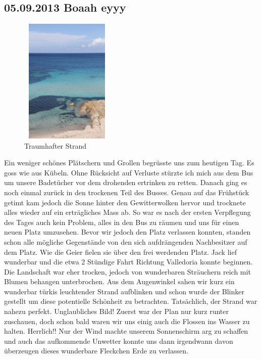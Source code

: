 \subsection{05.09.2013 Boaah eyyy} 

\begin{figure} 
  \begin{centering}
    \includegraphics[width=0.4\textwidth, height=6cm, keepaspectratio]{../Bilder/Sardinien/27.jpg}
    \caption{Traumhafter Strand}
  \end{centering}
\end{figure} 

Ein weniger schönes Plätschern und Grollen begrüsste uns zum heutigen Tag.
Es goss wie aus Kübeln.
Ohne Rücksicht auf Verluste stürzte ich mich aus dem Bus um unsere Badetücher vor dem drohenden ertrinken zu retten.
Danach ging es noch einmal zurück in den trockenen Teil des Busses.
Genau auf das Frühstück getimt kam jedoch die Sonne hinter den Gewitterwolken hervor und trocknete alles wieder auf ein erträgliches Mass ab.
So war es nach der ersten Verpflegung des Tages auch kein Problem, alles in den Bus zu räumen und uns für einen neuen Platz umzusehen.
Bevor wir jedoch den Platz verlassen konnten, standen schon alle mögliche Gegenstände von den sich aufdrängenden Nachbesitzer auf dem Platz.
Wie die Geier fielen sie über den frei werdenden Platz.
Jack lief wunderbar und die etwa 2 Stündige Fahrt Richtung Valledoria konnte beginnen.
Die Landschaft war eher trocken, jedoch von wunderbaren Sträuchern reich mit Blumen behangen unterbrochen.
Aus dem Augenwinkel sahen wir kurz ein wunderbar türkis leuchtender Strand aufblinken und schon wurde der Blinker gestellt um diese potentielle Schönheit zu betrachten.
Tatsächlich, der Strand war nahezu perfekt.
Unglaubliches Bild!  Zuerst war der Plan nur kurz runter zuschauen, doch schon bald waren wir uns einig auch die Flossen ins Wasser zu halten.
Herrlich!! Nur der Wind machte unserem Sonnenschirm arg zu schaffen und auch das aufkommende Unwetter konnte uns dann irgendwann davon überzeugen dieses wunderbare Fleckchen Erde zu verlassen. 

